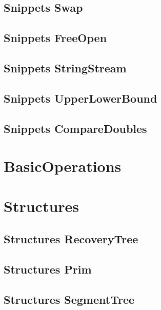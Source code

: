 \subsection{Snippets Swap}
\raggedbottom
\hrulefill
\subsection{Snippets FreeOpen}
\raggedbottom
\hrulefill
\subsection{Snippets StringStream}
\raggedbottom
\hrulefill
\subsection{Snippets UpperLowerBound}
\raggedbottom
\hrulefill
\subsection{Snippets CompareDoubles}
\raggedbottom
\hrulefill

\section{BasicOperations}

\section{Structures}
\subsection{Structures RecoveryTree}
\raggedbottom
\hrulefill
\subsection{Structures Prim}
\raggedbottom
\hrulefill
\subsection{Structures SegmentTree}
\raggedbottom
\hrulefill
